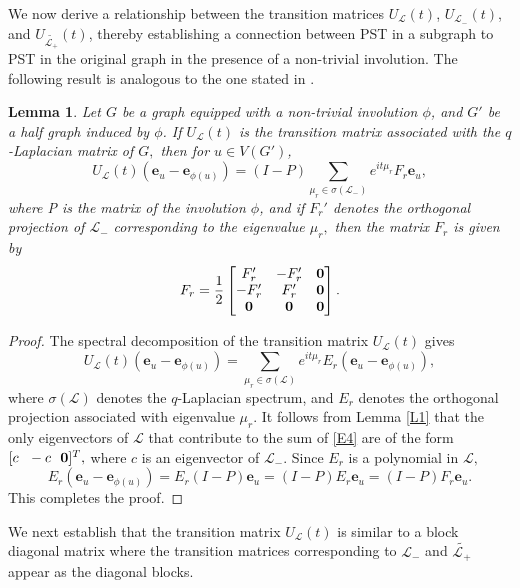 \documentclass[12pt,a4paper]{article}
\newtheorem{lem}{Lemma}
\def \e {{\mathbf e}}
\def \o {{\bf 0}}
\newcommand{\ob}[1]{\left(#1\right)}
\begin{document}
We now derive a relationship between the transition matrices $U_\mathscr{L}(t)$, $U_{\mathscr{L}_{-}}(t)$, and $U_{\widetilde{\mathscr{L}_+}}(t)$, thereby establishing a connection between PST in a subgraph to PST in the original graph in the presence of a non-trivial involution. The following result is analogous to the one stated in \cite[Lemma 4]{pal7}.
 \begin{lem}\label{L2}
 Let $G$ be a graph equipped with a non-trivial involution $\phi$, and $G'$ be a half graph induced by $\phi$. If $U_\mathscr{L}(t)$ is the transition matrix associated with the $q$-Laplacian matrix of $G,$ then for $u \in V(G')$,
 \begin{equation}\label{E3}
 U_\mathscr{L}(t)\ob{\e_u-\e_{\phi(u)}}=(I-P)\sum_{\mu_r \in \sigma(\mathscr{L}_-)}e^{it\mu_r}F_r\e_u,
 \end{equation}
 where P is the matrix of the involution $\phi$, and if $F_r'$ denotes the orthogonal projection of $\mathscr{L}_-$ corresponding to the eigenvalue $\mu_r,$ then the matrix $F_r$ is given by
 $$F_r=\frac{1}{2}\begin{bmatrix}
 F_r'&-F_r'&\o\\
 -F_r'& F_r'& \o\\
 \o& \o &\o
 \end{bmatrix}.$$
 \end{lem}
 \begin{proof}
The spectral decomposition of the transition matrix $U_\mathscr{L}(t)$ gives
  \begin{equation}\label{E4}
  U_\mathscr{L}(t)\ob{\e_u-\e_{\phi(u)}}=\sum_{\mu_r \in \sigma(\mathscr{L})}e^{it\mu_r}E_r\ob{\e_u-\e_{\phi(u)}},    
  \end{equation}
where $\sigma(\mathscr{L})$ denotes the $q$-Laplacian spectrum, and $E_r$ denotes the orthogonal projection associated with eigenvalue $\mu_r$. It follows from Lemma \ref{L1} that the only eigenvectors of $\mathscr{L}$ that contribute to the sum of \eqref{E4} are of the form $[c~~ -c~~ \o]^T,$ where $c $ is an eigenvector of $\mathscr{L}_-.$ Since $E_r$ is a polynomial in $\mathscr{L},$
\[E_r\ob{\e_u-\e_{\phi(u)}}=E_r(I-P)\e_u=(I-P)E_r\e_u=(I-P)F_r\e_u.\]
This completes the proof.
 \end{proof}
 We next establish that the transition matrix $U_\mathscr{L}(t)$ is similar to a block diagonal matrix where the transition matrices corresponding to  $\mathscr{L}_{-}$ and $\widetilde{\mathscr{L}_+}$ appear as the diagonal blocks.
\end{document}
